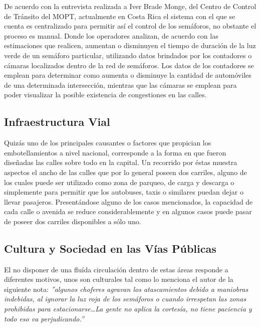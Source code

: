 \documentclass[12pt,journal,compsoc]{IEEEtran}
\begin{document}
		De acuerdo con la entrevista realizada a Iver Brade Monge, del Centro de
	Control de Tr\'{a}nsito del MOPT,  actualmente en Costa Rica el sistema con el que se cuenta es centralizado para permitir as\'{i} el control de los sem\'{a}foros, no obstante el proceso
	es manual. Donde los operadores analizan, de
	acuerdo con las estimaciones que realicen, aumentan o disminuyen el tiempo de duraci\'{o}n de la luz verde de un sem\'{a}foro particular, utilizando datos brindados por los contadores o c\'{a}maras localizados dentro de la red de sem\'{a}foros. Los datos de los contadores se emplean para determinar como aumenta o disminuye la cantidad de autom\'{o}viles de una determinada intersecci\'{o}n, mientras que las c\'{a}maras se emplean para poder visualizar la posible existencia de congestiones en las calles.

	\subsection{Infraestructura Vial}
	Quiz\'{a}s uno de los principales causantes o factores que propician los embotellamientos a nivel nacional, corresponde a la forma en que fueron dise\~{n}adas las calles sobre todo en la capital. Un recorrido por \'{e}stas muestra aspectos el ancho de las calles que por lo general poseen dos carriles, alguno de los cuales puede ser utilizado como zona de parqueo, de carga y descarga o simplemente para permitir que los autobuses, taxis o similares puedan dejar o llevar pasajeros. Present\'{a}ndose alguno de los casos mencionados, la capacidad de cada calle o avenida se reduce considerablemente y en algunos casos puede pasar de poseer dos carriles disponibles a s\'{o}lo uno. 	
	
	\subsection{Cultura y Sociedad en las V\'{i}as P\'{u}blicas}
		El no disponer de una flu\'{i}da circulaci\'{o}n dentro de estas \'{a}reas
		responde a diferentes motivos, unos son culturales tal como lo menciona el autor de la siguiente
	nota: \textit{''algunos choferes agravan los atascamientos debido a
	maniobras indebidas, al ignorar la luz roja de los sem\'{a}foros o cuando irrespetan las
	zonas prohibidas para estacionarse\ldots La gente no aplica la cortes\'{i}a, no
	tiene paciencia y todo eso va perjudicando.''}
	\cite{Villegas2012}
	
\end{document}
